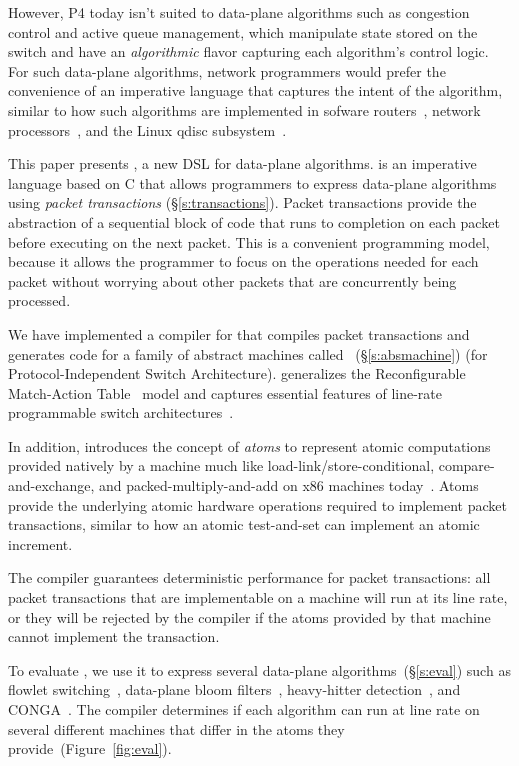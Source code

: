 However, P4 today isn't suited to data-plane algorithms such as congestion
control and active queue management, which manipulate state stored on the
switch and have an \textit{algorithmic} flavor capturing each algorithm's
control logic.  For such data-plane algorithms, network programmers would
prefer the convenience of an imperative language that captures the intent of
the algorithm, similar to how such algorithms are implemented in sofware
routers~\cite{click}, network processors~\cite{packetc, nova}, and the Linux
qdisc subsystem~\cite{qdisc}.

This paper presents \pktlanguage, a new DSL for data-plane algorithms.
\pktlanguage is an imperative language based on C that allows programmers to
express data-plane algorithms using {\em packet transactions}
(\S\ref{s:transactions}).  Packet transactions provide the abstraction of a
sequential block of code that runs to completion on each packet before
executing on the next packet. This is a convenient programming model, because
it allows the programmer to focus on the operations needed for each packet
without worrying about other packets that are concurrently being processed.

We have implemented a compiler for \pktlanguage that compiles \pktlanguage
packet transactions and generates code for a family of abstract machines called
\absmachine~(\S\ref{s:absmachine}) (for Protocol-Independent Switch
Architecture). \absmachine generalizes the Reconfigurable Match-Action
Table~\cite{rmt} model and captures essential features of line-rate programmable
switch architectures~\cite{rmt, xpliant, flexpipe}.

In addition, \absmachine introduces the concept of {\em atoms} to represent
atomic computations provided natively by a \absmachine machine much like
load-link/store-conditional, compare-and-exchange, and packed-multiply-and-add
on x86 machines today~\cite{x86_manual}.  Atoms provide the underlying atomic
hardware operations required to implement packet transactions, similar to how
an atomic test-and-set can implement an atomic increment.

The \pktlanguage compiler guarantees deterministic performance for packet
transactions: all packet transactions that are implementable on a \absmachine
machine will run at its line rate, or they will be rejected by the compiler if
the atoms provided by that \absmachine machine cannot implement the
transaction.

To evaluate \pktlanguage, we use it to express several data-plane
algorithms~(\S\ref{s:eval}) such as flowlet switching~\cite{flowlets},
data-plane bloom filters~\cite{bloom}, heavy-hitter
detection~\cite{opensketch}, and CONGA~\cite{conga}.  The \pktlanguage compiler
determines if each algorithm can run at line rate on several different
\absmachine machines that differ in the atoms they
provide~(Figure~\ref{fig:eval}).

